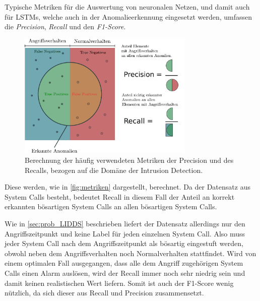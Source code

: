    Typische Metriken für die Auswertung von neuronalen Netzen, und damit auch für \acp{LSTM}, welche auch in der Anomalieerkennung eingesetzt werden, umfassen die \textit{Precision}, \textit{Recall} und den \textit{F1-Score}.
    \begin{figure}
        \centering
        \includegraphics[width=0.75\textwidth]{images/Illustrationen/Precision.pdf}
        \caption[Darstellung Precision und Recall]{Berechnung der häufig verwendeten Metriken der Precision und des Recalls, bezogen auf die Domäne der Intrusion Detection.}\label{fig:metriken}
    \end{figure}
    Diese werden, wie in \autoref{fig:metriken} dargestellt, berechnet.
    Da der Datensatz aus System Calls besteht, bedeutet Recall in diesem Fall der Anteil an korrekt erkannten bösartigen System Calls an allen bösartigen System Calls.\par\medskip
    Wie in \autoref{sec:prob_LIDDS} beschrieben liefert der Datensatz allerdings nur den Angriffszeitpunkt und keine Label für jeden einzelnen System Call.
    Also muss jeder System Call nach dem Angriffszeitpunkt als bösartig eingestuft werden, obwohl neben dem Angriffsverhalten noch Normalverhalten stattfindet.
    Wird von einem optimalen Fall ausgegangen, dass alle dem Angriff zugehörigen System Calls einen Alarm auslösen, wird der Recall immer noch sehr niedrig sein und damit keinen realistischen Wert liefern.
    Somit ist auch der F1-Score wenig nützlich, da sich dieser aus Recall und Precision zusammensetzt.\par\medskip

